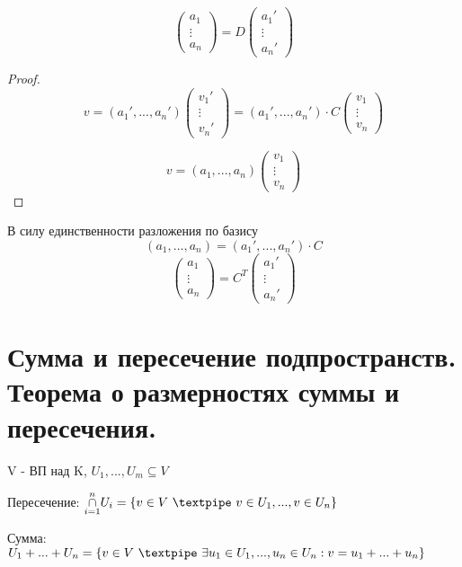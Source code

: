 \documentclass[12pt, fleqn]{article}
\begin{document}
			\begin{theorem} 
					\[\begin{pmatrix}
						a_1\\
						\vdots\\
						a_n
					\end{pmatrix} = D
				   \begin{pmatrix}
				   		a_1'\\
						\vdots\\
						a_n'
				   \end{pmatrix}\]
			\end{theorem}
			\begin{proof}
				\[v = (a_1', ..., a_n') \begin{pmatrix}
					v_1'\\
					\vdots\\
					v_n'
				\end{pmatrix} =
				(a_1', ..., a_n') \cdot C \begin{pmatrix}
					v_1 \\
					\vdots\\
					v_n
				\end{pmatrix} \]

				\[v = (a_1, ..., a_n) \begin{pmatrix}
					v_1\\
					\vdots\\
					v_n
				\end{pmatrix} \]
			\end{proof}
			В силу единственности разложения по базису
			\[(a_1, ..., a_n) = (a_1', ..., a_n') \cdot C  \]
			\[\begin{pmatrix}
				a_1\\
				\vdots\\
				a_n
			\end{pmatrix} = C^T
			\begin{pmatrix}
				a_1'\\
				\vdots\\
				a_n'
			\end{pmatrix}\]


\section{Сумма и пересечение подпространств. Теорема о размерностях суммы и пересечения.}
  \begin{definition}
    V - ВП над K, \qq $U_1,...,U_m \subseteq V$

    Пересечение: $\underset{i=1}{\overset{n}{\cap}} U_i = \{ v \in V\ \textpipe\ v \in U_1,...,v \in U_n\}$

    Сумма: $U_1+...+U_n=\{v \in V\ \textpipe\ \exists u_1 \in U_1,...,u_n \in U_n: v=u_1+... + u_n \}$
  \end{definition}
\end{document}
